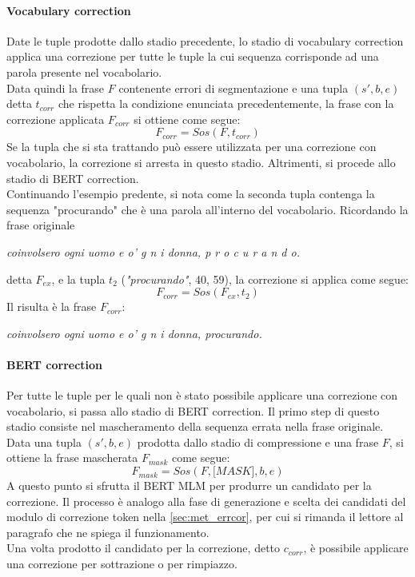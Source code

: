 \paragraph{Vocabulary correction}
Date le tuple prodotte dallo stadio precedente, lo stadio di vocabulary correction applica una correzione per tutte le tuple la cui sequenza corrisponde ad una parola presente nel vocabolario. \\
Data quindi la frase $F$ contenente errori di segmentazione e una tupla $(s\prime,b,e)$ detta $t_{corr}$ che rispetta la condizione enunciata precedentemente, la frase con la correzione applicata $F_{corr}$ si ottiene come segue:
\begin{equation}
F_{corr} = \textit{Sos}(F,t_{corr})
\end{equation}
Se la tupla che si sta trattando può essere utilizzata per una correzione con vocabolario, la correzione si arresta in questo stadio. Altrimenti, si procede allo stadio di BERT correction.\\
Continuando l'esempio predente, si nota come la seconda tupla contenga la sequenza "procurando" che è una parola all'interno del vocabolario. Ricordando la frase originale
\begin{center}
\textit{coinvolsero ogni uomo e o' g n i donna, p r o c u r a n d o.}
\end{center}
detta $F_{ex}$, e la tupla $t_2$ (\textit{"procurando"}, 40, 59), la correzione si applica come segue:
\begin{equation}
F_{corr} = \textit{Sos}(F_{ex},t_{2})
\end{equation}
Il risulta è la frase $F_{corr}$:
\begin{center}
\textit{coinvolsero ogni uomo e o' g n i donna, procurando.}
\end{center}


\paragraph{BERT correction}
Per tutte le tuple per le quali non è stato possibile applicare una correzione con vocabolario, si passa allo stadio di BERT correction. Il primo step di questo stadio consiste nel mascheramento della sequenza errata nella frase originale. Data una tupla $(s\prime,b,e)$ prodotta dallo stadio di compressione e una frase $F$, si ottiene la frase mascherata $F_{mask}$ come segue:
\begin{equation}
F_{mask} = \textit{Sos}(F,\textit{[MASK]},b,e)
\end{equation}
A questo punto si sfrutta il BERT MLM per produrre un candidato per la correzione. Il processo è analogo alla fase di generazione e scelta dei candidati del modulo di correzione token nella \autoref{sec:met_errcor}, per cui si rimanda il lettore al paragrafo che ne spiega il funzionamento.\\
Una volta prodotto il candidato per la correzione, detto $c_{corr}$, è possibile applicare una correzione per sottrazione o per rimpiazzo.


